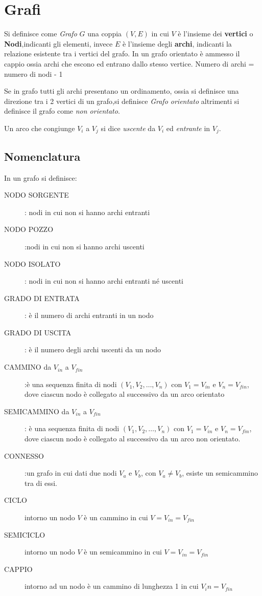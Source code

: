 \section{Grafi}
Si definisce come \emph{Grafo} $G$ una coppia $(V,E)$ in cui $V$ è l'insieme
dei \textbf{vertici} o \textbf{Nodi},indicanti gli elementi, invece $E$
 è l'insieme degli \textbf{archi}, indicanti la relazione esistente tra i vertici del grafo.\newline
In un grafo orientato è ammesso il cappio ossia archi che escono ed entrano dallo stesso vertice.\newline
Numero di archi = numero di nodi - 1

Se in grafo tutti gli archi presentano un ordinamento, ossia si definisce una direzione
tra i 2 vertici di un grafo,si definisce \emph{Grafo orientato}
altrimenti si definisce il grafo come \emph{non orientato}.

Un arco che congiunge $V_i$ a $V_j$ si dice \emph{uscente} da $V_i$ ed \emph{entrante} in $V_j$.

\subsection{Nomenclatura}
In un grafo si definisce:
\begin{description}
    \item[NODO SORGENTE]: nodi in cui non si hanno archi entranti
    \item[NODO POZZO]:nodi in cui non si hanno archi uscenti
    \item[NODO ISOLATO]: nodi in cui non si hanno archi entranti né uscenti
    \item[GRADO DI ENTRATA]: è il numero di archi entranti in un nodo
    \item[GRADO DI USCITA]: è il numero degli archi uscenti da un nodo
    \item[CAMMINO da $V_{in}$ a $V_{fin}$]:è una sequenza finita di nodi $(V_1,V_2,\dots,V_n)$
     con $V_1 = V_{in}$ e $V_n = V_{fin}$, dove ciascun nodo è collegato al successivo da un arco orientato
    \item[SEMICAMMINO da $V_{in}$ a $V_{fin}$]: è una sequenza finita di nodi
     $(V_1,V_2,\dots,V_n)$ con $V_1 = V_{in}$ e $V_n = V_{fin}$, dove ciascun nodo
     è collegato al successivo da un arco non orientato.
    \item[CONNESSO]:un grafo in cui dati due nodi $V_a$ e $V_b$, con $V_a \neq V_b$,
                    esiste un semicammino tra di essi.
    \item[CICLO]intorno un nodo $V$ è un cammino in cui $V = V_{in} = V_{fin}$
    \item[SEMICICLO]intorno un nodo $V$ è un semicammino in cui $V = V_{in} = V_{fin}$
    \item[CAPPIO]intorno ad un nodo è un cammino di lunghezza 1 in cui $V_in = V_{fin}$
\end{description}

